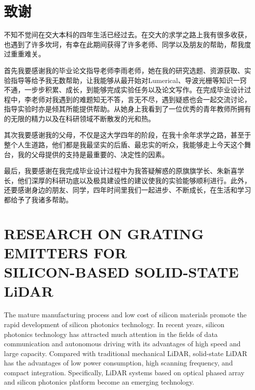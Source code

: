 \documentclass[UTF8,a4paper,12pt]{ctexart}
\numberwithin{equation}{section}
\begin{document}
\newpage
{}

\section*{致\qquad 谢}

\hspace{8mm}不知不觉间在交大本科的四年生活已经过去。在交大的求学之路上我有很多收获，也遇到了许多坎坷，有幸在此期间获得了许多老师、同学以及朋友的帮助，帮我度过重重难关。

首先我要感谢我的毕业论文指导老师李雨老师，她在我的研究选题、资源获取、实验指导等给予我无数帮助，让我能够从最开始对Lumerical、导波光栅等知识一窍不通，一步步积累、成长，到能够完成实验任务以及论文写作。在完成毕业设计过程中，李老师对我遇到的难题知无不答，言无不尽，遇到疑惑也会一起交流讨论，指导实验时亦是倾其所能提供帮助。从她身上我看到了一位优秀的青年教师所拥有的无限的精力以及在科研领域不断散发的光和热。

其次我要感谢我的父母，不仅是这大学四年的阶段，在我十余年求学之路，甚至于整个人生道路，他们都是我最坚实的后盾、最忠实的听众，我能够走上今天这个舞台，我的父母提供的支持是最重要的、决定性的因素。

最后，我要感谢在我完成毕业设计过程中为我答疑解惑的原旗旗学长、朱新喜学长，他们深厚的科研功底以及极具建设性的建议使我的实验能够顺利进行。此外，还要感谢身边的朋友、同学，四年时间里我们一起进步、不断成长，在生活和学习都给予了我诸多帮助。
\newpage
{}
\fancyhead[RH]{}
\section*{RESEARCH ON GRATING EMITTERS FOR \\
SILICON-BASED SOLID-STATE LiDAR}%

\hspace{8mm}
The mature manufacturing process and low cost of silicon materials promote the rapid development of silicon photonics technology. In recent years, silicon photonics technology has attracted much attention in the fields of data communication and autonomous driving with its advantages of high speed and large capacity. Compared with traditional mechanical LiDAR, solid-state LiDAR has the advantages of low power consumption, high scanning frequency, and compact integration. Specifically, LiDAR systems based on optical phased array and silicon photonics platform become an emerging technology.
\end{document}
